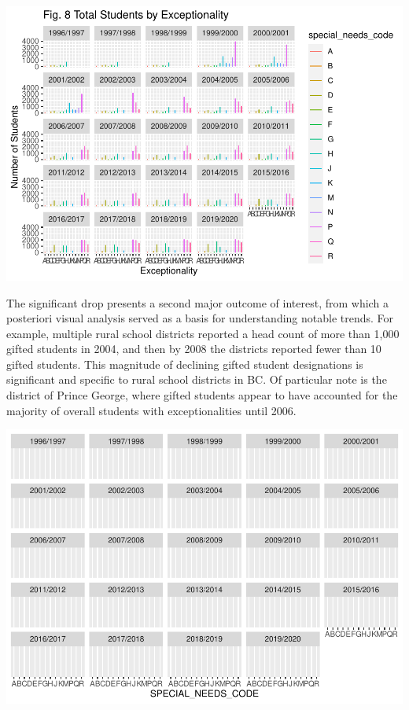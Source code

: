 \documentclass[
  english,
  man,floatsintext]{apa6}
\begin{document}
\includegraphics{Final_project_files/figure-latex/urban facet bars-1.pdf}

The significant drop presents a second major outcome of interest, from which a posteriori visual analysis served as a basis for understanding notable trends. For example, multiple rural school districts reported a head count of more than 1,000 gifted students in 2004, and then by 2008 the districts reported fewer than 10 gifted students. This magnitude of declining gifted student designations is significant and specific to rural school districts in BC. Of particular note is the district of Prince George, where gifted students appear to have accounted for the majority of overall students with exceptionalities until 2006.

\includegraphics{Final_project_files/figure-latex/rural play-1.pdf}
\end{document}
